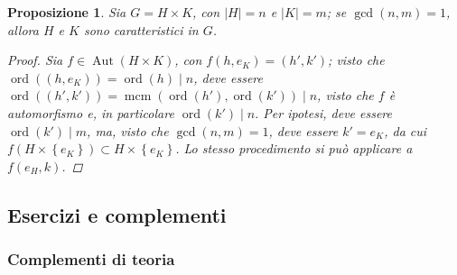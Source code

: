 \documentclass[11pt]{scrartcl}
\theoremstyle{style1}
\newtheorem{prop}{Proposizione}[section]
\numberwithin{equation}{subsection}
\begin{document}
\begin{prop}
	Sia $G = H\times K$, con $\lvert H \rvert = n$ e $\lvert K \rvert = m$; se $\operatorname{gcd}(n,m) =1$, allora $H$ e $K$ sono caratteristici in $G$.
	\begin{proof}
		Sia $f \in \operatorname{Aut} (H \times K)$, con $f(h,e_K) = (h',k')$; visto che $\operatorname{ord}((h,e_K)) = \operatorname{ord}(h)  \mid n$, deve essere $\operatorname{ord}((h',k')) = \operatorname{mcm} (\operatorname{ord}(h') ,\operatorname{ord}(k') )  \mid n$, visto che $f$ \`e automorfismo e, in particolare $\operatorname{ord}(k')  \mid n$.
		Per ipotesi, deve essere $\operatorname{ord}(k')  \mid m $, ma, visto che $\operatorname{gcd}(n,m) =1 $, deve essere $k' = e_K$, da cui $f(H \times \left\{ e_K \right\} ) \subset H \times \left\{ e_K \right\} $.
		Lo stesso procedimento si pu\`o applicare a $f(e_H, k)$.
	\end{proof}
\end{prop}
\subsection{Esercizi e complementi}
\subsubsection{Complementi di teoria}
\end{document}
